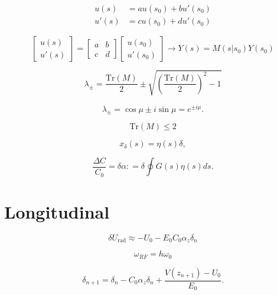 \begin{align}
    u(s) &= au(s_0) + bu'(s_0) \\
    u'(s) &= cu(s_0) + du'(s_0)
\end{align}

\[
\left[ \begin{array}{c} 
u(s) \\
u'(s) \end{array} \right] = \left[ \begin{array}{cc} 
a & b \\
c & d \end{array} \right]\left[ \begin{array}{c} 
u(s_0) \\
u'(s_0) \end{array} \right] \rightarrow Y(s) = M(s|s_0)Y(s_0)
\]


\[
\lambda_{\pm} = \dfrac{\mathrm{Tr}\left(M\right)}{2} \pm \sqrt{\left(\dfrac{\mathrm{Tr}(M)}{2}\right)^2 - 1}
\]


\[
\lambda_{\pm} = \cos\mu \pm i \sin\mu = e^{\pm i\mu}.
\]


\begin{equation}
    \mathrm{Tr}\left(M\right) \leq 2
\end{equation}

\begin{equation}
    x_\delta (s) = \eta(s) \delta, 
\end{equation}

\begin{equation}
    \dfrac{\Delta C}{C_0} = \delta\alpha  : = \delta \oint G(s) \eta(s) ds.
\end{equation}

\section{Longitudinal}


\begin{equation}
    \delta U_{\mathrm{rad}} \approx -U_0 - E_0C_0\alpha_z \delta_n
\end{equation}

\begin{equation}
    \omega_{RF} = h\omega_0
\end{equation}

\begin{equation}
    \delta_{n+1} = \delta_n - C_0 \alpha_z \delta_n + \dfrac{V(z_{n+1})-U_0}{E_0}.
\end{equation}

